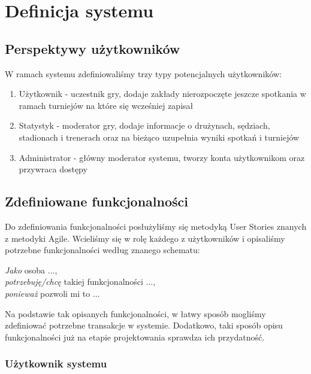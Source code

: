 \documentclass{mwrep}
\begin{document}
\chapter{Definicja systemu}

\section{Perspektywy użytkowników}
W ramach systemu zdefiniowaliśmy trzy typy potencjalnych użytkowników: \\
\begin{enumerate}
    \item Użytkownik - uczestnik gry, dodaje zakłady nierozpoczęte jeszcze spotkania w
    ramach turniejów na które się wcześniej zapisał\\ 

    \item Statystyk - moderator gry, dodaje informacje o drużynach, sędziach, stadionach i trenerach
    oraz na bieżąco uzupełnia wyniki spotkań i turniejów \\ 

    \item Administrator - główny moderator systemu, tworzy konta użytkownikom oraz przywraca dostępy \\
    
\end{enumerate}

\section{Zdefiniowane funkcjonalności}
Do zdefiniowania funkcjonalności posłużyliśmy się metodyką User Stories znanych z metodyki Agile. Wcieliśmy się 
w rolę każdego z użytkowników i opisaliśmy potrzebne funkcjonalności według znanego schematu:

\begin{center}
    \emph{Jako} osoba ..., \\ \emph{potrzebuję/chcę} takiej funkcjonalności ...,\\  \emph{ponieważ} pozwoli mi to ...  
\end{center}

Na podstawie tak opisanych funkcjonalności, w łatwy sposób mogliśmy zdefiniować potrzebne transakcje w systemie. Dodatkowo,
taki sposób opisu funkcjonalności już na etapie projektowania sprawdza ich przydatność.

\subsection{Użytkownik systemu}
\end{document}
